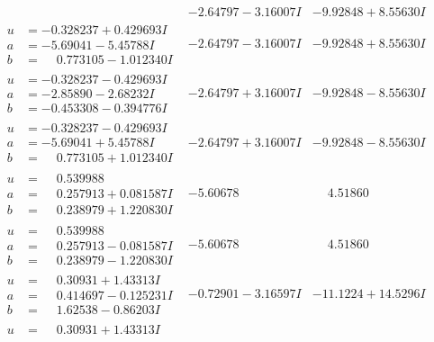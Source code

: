 \documentclass[1p]{elsarticle_modified}
\theoremstyle{definition}
\begin{document}
$$\begin{array}{c|c|c}
 & -2.64797 - 3.16007 I & -9.92848 + 8.55630 I \\ \hline\begin{aligned}
u &= -0.328237 + 0.429693 I \\
a &= -5.69041 - 5.45788 I \\
b &= \phantom{-}0.773105 - 1.012340 I\end{aligned}
 & -2.64797 - 3.16007 I & -9.92848 + 8.55630 I \\ \hline\begin{aligned}
u &= -0.328237 - 0.429693 I \\
a &= -2.85890 - 2.68232 I \\
b &= -0.453308 - 0.394776 I\end{aligned}
 & -2.64797 + 3.16007 I & -9.92848 - 8.55630 I \\ \hline\begin{aligned}
u &= -0.328237 - 0.429693 I \\
a &= -5.69041 + 5.45788 I \\
b &= \phantom{-}0.773105 + 1.012340 I\end{aligned}
 & -2.64797 + 3.16007 I & -9.92848 - 8.55630 I \\ \hline\begin{aligned}
u &= \phantom{-}0.539988\phantom{ +0.000000I} \\
a &= \phantom{-}0.257913 + 0.081587 I \\
b &= \phantom{-}0.238979 + 1.220830 I\end{aligned}
 & -5.60678\phantom{ +0.000000I} & \phantom{-}4.51860\phantom{ +0.000000I} \\ \hline\begin{aligned}
u &= \phantom{-}0.539988\phantom{ +0.000000I} \\
a &= \phantom{-}0.257913 - 0.081587 I \\
b &= \phantom{-}0.238979 - 1.220830 I\end{aligned}
 & -5.60678\phantom{ +0.000000I} & \phantom{-}4.51860\phantom{ +0.000000I} \\ \hline\begin{aligned}
u &= \phantom{-}0.30931 + 1.43313 I \\
a &= \phantom{-}0.414697 - 0.125231 I \\
b &= \phantom{-}1.62538 - 0.86203 I\end{aligned}
 & -0.72901 - 3.16597 I & -11.1224 + 14.5296 I \\ \hline\begin{aligned}
u &= \phantom{-}0.30931 + 1.43313 I \\

\end{aligned}
\end{array}$$
\end{document}
